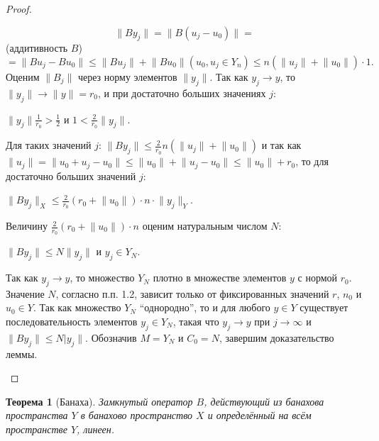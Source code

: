 \documentclass[12pt,a4paper,titlepage,oneside]{book}
\theoremstyle{definition}
\theoremstyle{plain}
\newtheorem*{theorem}{Теорема}
\theoremstyle{remark}
\theoremstyle{remark}
\theoremstyle{remark}
\theoremstyle{remark}
\theoremstyle{plain}
\theoremstyle{plain}
\begin{document}
\begin{proof}
\begin{enumerate}
$$\lVert By_j\rVert = \lVert B(u_j - u_0)\rVert =$$ (аддитивность $B$) 
$$ = \lVert Bu_j - Bu_0\rVert \leqslant \lVert Bu_j\rVert + \lVert Bu_0\rVert(u_0, u_j \in Y_n) \leqslant n(\lVert u_j\rVert + \lVert u_0\rVert)\cdot 1.$$
Оценим $\lVert B_j\rVert$ через норму элементов $\lVert y_j\rVert$. Так как $y_j \to y$, то $\lVert y_j\rVert \to \lVert y\rVert=r_0$, и при достаточно больших значениях $j$:

\begin{center}
$\lVert y_j\rVert\frac{1}{r_0}>\frac12$ и $1<\frac{2}{r_0}\lVert y_j\rVert$.
\end{center}

Для таких значений $j$: $\lVert By_j\rVert\le\frac{2}{r_0}n(\lVert u_j\rVert + \lVert u_0\rVert)$ и так как $\lVert u_j\rVert = \lVert u_0 + u_j - u_0\rVert \leqslant \lVert u_0\rVert + \lVert u_j - u_0\rVert \leqslant \lVert u_0\rVert + r_0$, то для достаточно больших значений $j$:

\begin{center}
$\lVert By_j\rVert_X \leqslant \frac{2}{r_0}(r_0 + \lVert u_0\rVert)\cdot n\cdot \lVert y_j\rVert_Y$.
\end{center}

Величину $\frac{2}{r_0}(r_0 + \lVert u_0\rVert)\cdot n$ оценим натуральным числом $N$:

\begin{center}
$\lVert By_j\rVert \leqslant N\lVert y_j\rVert$ и $y_j \in Y_N$.
\end{center}

Так как $y_j \to y$, то множество $Y_N$ плотно в множестве элементов $y$ с нормой $r_0$. Значение $N$, согласно п.п. 1.2, зависит только от фиксированных значений $r$, $n_0$ и $u_0 \in Y$. Так как множество $Y_N$ ``однородно'', то и для любого $y \in Y$ существует последовательность элементов $y_j \in Y_N$, такая что $y_j \to y$ при $j \to \infty$ и $\lVert By_j\rVert \leqslant N\lvert y_j\rVert$. Обозначив $M = Y_N$ и $C_0 = N$, завершим доказательство леммы.
\qedhere
\end{enumerate}
\end{proof}

\begin{theorem}[Банаха]
Замкнутый оператор $B$, действующий из банахова пространства $Y$ в банахово пространство $X$ и определённый на всём пространстве $Y$, линеен.
\end{theorem}
\end{document}
